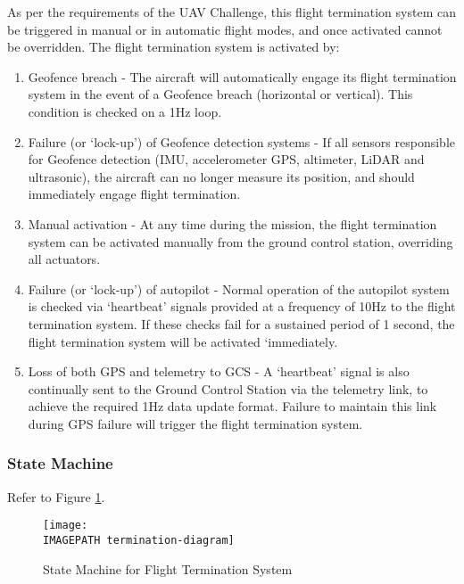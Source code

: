 As per the requirements of the UAV Challenge, this flight termination system can be triggered in manual or in automatic flight modes, and once activated cannot be overridden. The flight termination system is activated by:
\begin{enumerate}
	\item Geofence breach - The aircraft will automatically engage its flight termination system in the event of a Geofence breach (horizontal or vertical). This condition is checked on a 1Hz loop.
	\item Failure (or ‘lock-up’) of Geofence detection systems - If all sensors responsible for Geofence detection (IMU, accelerometer GPS, altimeter, LiDAR and ultrasonic), the aircraft can no longer measure its position, and should immediately engage flight termination.
	\item Manual activation - At any time during the mission, the flight termination system can be activated manually from the ground control station, overriding all actuators.
	\item Failure (or ‘lock-up’) of autopilot - Normal operation of the autopilot system is checked via ‘heartbeat’ signals provided at a frequency of 10Hz to the flight termination system. If these checks fail for a sustained period of 1 second, the flight termination system will be activated `immediately.
	\item Loss of both GPS and telemetry to GCS - A ‘heartbeat’ signal is also continually sent to the Ground Control Station via the telemetry link, to achieve the required 1Hz data update format. Failure to maintain this link during GPS failure will trigger the flight termination system.
\end{enumerate}

\subsubsection{State Machine}
Refer to Figure \ref{fig:termination-diagram}.
\begin{figure}
	\centering
	\texttt{[image: \\IMAGEPATH termination-diagram]}
	\caption{State Machine for Flight Termination System}
	\label{fig:termination-diagram}
\end{figure}

